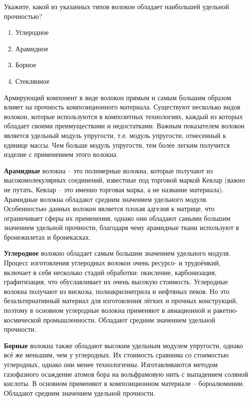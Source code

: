 
Укажите, какой из указанных типов волокон обладает наибольшей удельной прочностью?

\begin{enumerate}
    \item Углеродное
    \item Арамидное
    \item Борное
    \item Стеклянное
\end{enumerate}

\explanationSection

Армирующий компонент в виде волокон прямым и самым большим образом влияет на прочность композиционного материала. Существуют несколько видов волокон, которые используются в композитных технологиях, каждый из которых обладает своими преимуществами и недостатками. Важным показателем волокон является удельный модуль упругости, т.е. модуль упругости, отнесенный к единице массы. Чем больше модуль упругости, тем более легким получится изделие с применением этого волокна.

\textbf{Арамидные} волокна – это полимерные волокна, которые получают из высокомолекулярных соединений, известные под торговой маркой Кевлар (важно не путать, Кевлар – это именно торговая марка, а не название материала). Арамидные волокна обладают средним значением удельного модуля. Особенностью данных волокон является плохая адгезия к матрице, что ограничивает сферы их применения, однако они обладают самыми большим значением удельной прочности, благодаря чему арамидные ткани используют в бронежилетах и бронекасках. 

\textbf{Углеродное} волокно обладает самым большим значением удельного модуля. Процесс изготовления углеродных волокон очень ресурсо- и трудоёмкий, включает в себя несколько стадий обработки: окисление, карбонизация, графитизация, что обуславливает их очень высокую стоимость. Углеродные волокна получают из вискозы, полиакрилнитрила и нефтяных пеков. Но это безальтернативный материал для изготовления лёгких и прочных конструкций, поэтому в основном углеродные волокна применяют в авиационной и ракетно-космической промышленности. Обладают средним значением удельной прочности.

\textbf{Борные} волокна также обладают высоким удельным модулем упругости, однако всё же меньшим, чем у углеродных. Их стоимость сравнима со стоимостью углеродных, однако они менее технологичны. Изготавливаются методом газофазного осаждение атомов бора на вольфрамовую нить с выпадением соляной кислоты. В основном применяют в композиционном материале – бороалюминии. Обладают средним значением удельной прочности.

